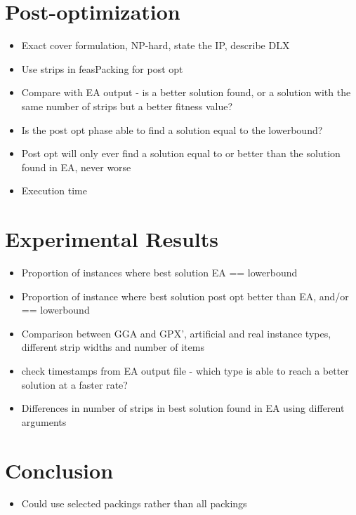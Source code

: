 \documentclass{elsarticle}
\begin{document}
\section{Post-optimization}
\begin{itemize}
	\item Exact cover formulation, NP-hard, state the IP, describe DLX
	\item Use strips in feasPacking for post opt
	\item Compare with EA output - is a better solution found, or a solution with the same number of strips but a better fitness value?
	\item Is the post opt phase able to find a solution equal to the lowerbound?
	\item Post opt will only ever find a solution equal to or better than the solution found in EA, never worse
	\item Execution time
\end{itemize}

\section{Experimental Results}
\begin{itemize}
	\item Proportion of instances where best solution EA == lowerbound
	\item Proportion of instance where best solution post opt better than EA, and/or == lowerbound
	\item Comparison between GGA and GPX', artificial and real instance types, different strip widths and number of items
	\item check timestamps from EA output file - which type is able to reach a better solution at a faster rate?
	\item Differences in number of strips in best solution found in EA using different arguments
\end{itemize}

\section{Conclusion}
\begin{itemize}
	\item Could use selected packings rather than all packings
\end{itemize}




\end{document}
